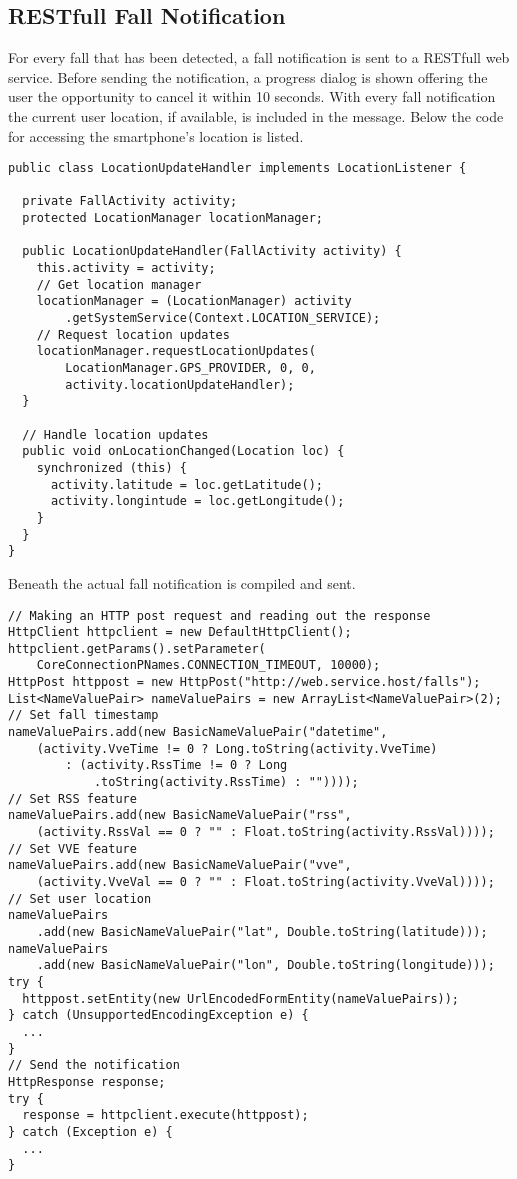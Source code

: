\subsection{RESTfull Fall Notification}
For every fall that has been detected, a fall notification is sent to a RESTfull web service. Before sending the notification, a progress dialog is shown offering the user the opportunity to cancel it within 10 seconds. With every fall notification the current user location, if available, is included in the message. Below the code for accessing the smartphone's location is listed.
\begin{lstlisting}
public class LocationUpdateHandler implements LocationListener {

  private FallActivity activity;
  protected LocationManager locationManager;

  public LocationUpdateHandler(FallActivity activity) {
    this.activity = activity;
    // Get location manager
    locationManager = (LocationManager) activity
        .getSystemService(Context.LOCATION_SERVICE);
    // Request location updates
    locationManager.requestLocationUpdates(
        LocationManager.GPS_PROVIDER, 0, 0,
        activity.locationUpdateHandler);
  }

  // Handle location updates
  public void onLocationChanged(Location loc) {
    synchronized (this) {
      activity.latitude = loc.getLatitude();
      activity.longintude = loc.getLongitude();
    }
  }
}
\end{lstlisting}
Beneath the actual fall notification is compiled and sent.
\begin{lstlisting}
// Making an HTTP post request and reading out the response
HttpClient httpclient = new DefaultHttpClient();
httpclient.getParams().setParameter(
    CoreConnectionPNames.CONNECTION_TIMEOUT, 10000);
HttpPost httppost = new HttpPost("http://web.service.host/falls");
List<NameValuePair> nameValuePairs = new ArrayList<NameValuePair>(2);
// Set fall timestamp
nameValuePairs.add(new BasicNameValuePair("datetime",
    (activity.VveTime != 0 ? Long.toString(activity.VveTime)
        : (activity.RssTime != 0 ? Long
            .toString(activity.RssTime) : ""))));
// Set RSS feature
nameValuePairs.add(new BasicNameValuePair("rss",
    (activity.RssVal == 0 ? "" : Float.toString(activity.RssVal))));
// Set VVE feature
nameValuePairs.add(new BasicNameValuePair("vve",
    (activity.VveVal == 0 ? "" : Float.toString(activity.VveVal))));
// Set user location
nameValuePairs
    .add(new BasicNameValuePair("lat", Double.toString(latitude)));
nameValuePairs
    .add(new BasicNameValuePair("lon", Double.toString(longitude)));
try {
  httppost.setEntity(new UrlEncodedFormEntity(nameValuePairs));
} catch (UnsupportedEncodingException e) {
  ...
}
// Send the notification
HttpResponse response;
try {
  response = httpclient.execute(httppost);
} catch (Exception e) {
  ...
}
\end{lstlisting}

